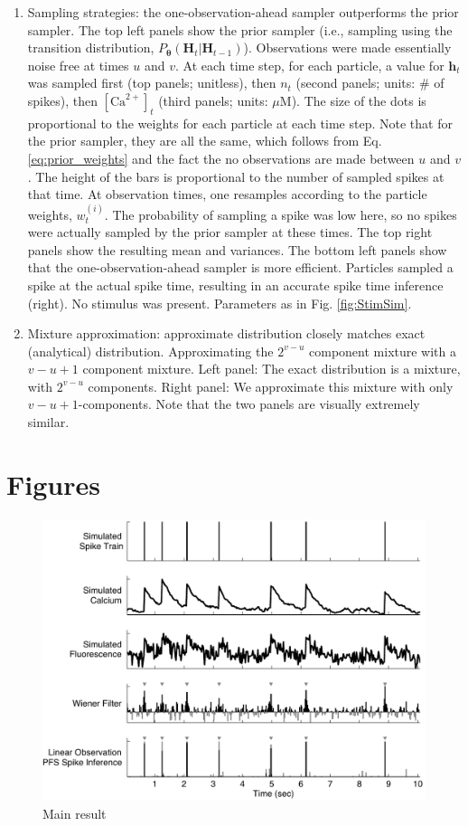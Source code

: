 \documentclass[10pt]{article}
\providecommand{\ve}[1]{\boldsymbol{#1}}
\providecommand{\ve}[1]{\boldsymbol{#1}}
\newcommand{\thetn}{\ve{\theta}}
\newcommand{\p}{P_{\thetn}}
\newcommand{\Ca}{[\text{Ca}^{2+}]}
\begin{document}
\begin{enumerate}
\item Sampling strategies: the one-observation-ahead sampler outperforms the prior sampler. The top left panels show the prior sampler (i.e., sampling using the transition distribution, $\p(\ve{H}_t | \ve{H}_{t-1})$).  Observations were made essentially noise free at times $u$ and $v$. At each time step, for each particle, a value for $\ve{h}_t$ was sampled first (top panels; unitless), then $n_t$ (second panels; units: $\#$ of spikes), then $\Ca_t$ (third panels; units: $\mu$M).  The size of the dots is proportional to the weights for each particle at each time step.  Note that for the prior sampler, they are all the same, which follows from Eq. \ref{eq:prior_weights} and the fact the no observations are made between $u$ and $v$.  The height of the bars is proportional to the number of sampled spikes at that time. At observation times, one resamples according to the particle weights, $w_t^{(i)}$. The probability of sampling a spike was low here, so no spikes were actually sampled by the prior sampler at these times.  The top right panels show the resulting mean and variances.  The bottom left panels show that the one-observation-ahead sampler is more efficient. Particles sampled a spike at the actual spike time, resulting in an accurate spike time inference (right).  No stimulus was present. Parameters as in Fig. \ref{fig:StimSim}.  
\item Mixture approximation: approximate distribution closely matches exact (analytical) distribution. Approximating the $2^{v-u}$ component mixture with a $v-u+1$ component mixture. Left panel:  The exact distribution is a mixture, with $2^{v-u}$ components. Right panel:  We approximate this mixture with only $v-u+1$-components. Note that the two panels are visually extremely similar. 
\end{enumerate}

\clearpage \newpage
\section*{Figures}

\begin{figure}[h]
\includegraphics[width=1.0\linewidth]{NoisySim_bw}
\caption{Main result}  \label{fig:noisy}
\end{figure}
\end{document}
